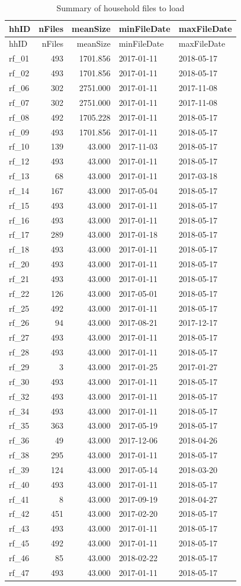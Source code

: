 \documentclass[]{article}
\begin{document}
\begin{longtable}[]{@{}lrrll@{}}
\caption{Summary of household files to load}\tabularnewline
\toprule
hhID & nFiles & meanSize & minFileDate & maxFileDate\tabularnewline
\midrule
\endfirsthead
\toprule
hhID & nFiles & meanSize & minFileDate & maxFileDate\tabularnewline
\midrule
\endhead
rf\_01 & 493 & 1701.856 & 2017-01-11 & 2018-05-17\tabularnewline
rf\_02 & 493 & 1701.856 & 2017-01-11 & 2018-05-17\tabularnewline
rf\_06 & 302 & 2751.000 & 2017-01-11 & 2017-11-08\tabularnewline
rf\_07 & 302 & 2751.000 & 2017-01-11 & 2017-11-08\tabularnewline
rf\_08 & 492 & 1705.228 & 2017-01-11 & 2018-05-17\tabularnewline
rf\_09 & 493 & 1701.856 & 2017-01-11 & 2018-05-17\tabularnewline
rf\_10 & 139 & 43.000 & 2017-11-03 & 2018-05-17\tabularnewline
rf\_12 & 493 & 43.000 & 2017-01-11 & 2018-05-17\tabularnewline
rf\_13 & 68 & 43.000 & 2017-01-11 & 2017-03-18\tabularnewline
rf\_14 & 167 & 43.000 & 2017-05-04 & 2018-05-17\tabularnewline
rf\_15 & 493 & 43.000 & 2017-01-11 & 2018-05-17\tabularnewline
rf\_16 & 493 & 43.000 & 2017-01-11 & 2018-05-17\tabularnewline
rf\_17 & 289 & 43.000 & 2017-01-18 & 2018-05-17\tabularnewline
rf\_18 & 493 & 43.000 & 2017-01-11 & 2018-05-17\tabularnewline
rf\_20 & 493 & 43.000 & 2017-01-11 & 2018-05-17\tabularnewline
rf\_21 & 493 & 43.000 & 2017-01-11 & 2018-05-17\tabularnewline
rf\_22 & 126 & 43.000 & 2017-05-01 & 2018-05-17\tabularnewline
rf\_25 & 492 & 43.000 & 2017-01-11 & 2018-05-17\tabularnewline
rf\_26 & 94 & 43.000 & 2017-08-21 & 2017-12-17\tabularnewline
rf\_27 & 493 & 43.000 & 2017-01-11 & 2018-05-17\tabularnewline
rf\_28 & 493 & 43.000 & 2017-01-11 & 2018-05-17\tabularnewline
rf\_29 & 3 & 43.000 & 2017-01-25 & 2017-01-27\tabularnewline
rf\_30 & 493 & 43.000 & 2017-01-11 & 2018-05-17\tabularnewline
rf\_32 & 493 & 43.000 & 2017-01-11 & 2018-05-17\tabularnewline
rf\_34 & 493 & 43.000 & 2017-01-11 & 2018-05-17\tabularnewline
rf\_35 & 363 & 43.000 & 2017-05-19 & 2018-05-17\tabularnewline
rf\_36 & 49 & 43.000 & 2017-12-06 & 2018-04-26\tabularnewline
rf\_38 & 295 & 43.000 & 2017-01-11 & 2018-05-17\tabularnewline
rf\_39 & 124 & 43.000 & 2017-05-14 & 2018-03-20\tabularnewline
rf\_40 & 493 & 43.000 & 2017-01-11 & 2018-05-17\tabularnewline
rf\_41 & 8 & 43.000 & 2017-09-19 & 2018-04-27\tabularnewline
rf\_42 & 451 & 43.000 & 2017-02-20 & 2018-05-17\tabularnewline
rf\_43 & 493 & 43.000 & 2017-01-11 & 2018-05-17\tabularnewline
rf\_45 & 492 & 43.000 & 2017-01-11 & 2018-05-17\tabularnewline
rf\_46 & 85 & 43.000 & 2018-02-22 & 2018-05-17\tabularnewline
rf\_47 & 493 & 43.000 & 2017-01-11 & 2018-05-17\tabularnewline
\bottomrule
\end{longtable}
\end{document}
